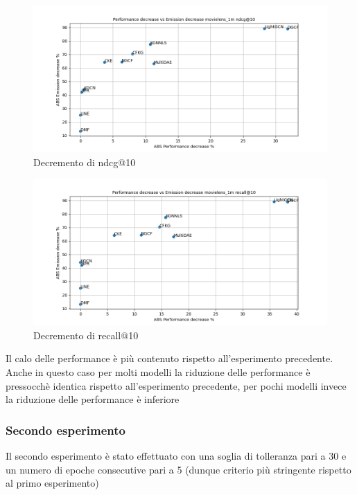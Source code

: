 \begin{figure}[H]
    \centering
    \includegraphics[scale=0.5]{images/decrement_ndcg@10_movielens_1m_40_5.png}
    \caption{Decremento di ndcg@10}
\end{figure}

\begin{figure}[H]
    \centering
    \includegraphics[scale=0.5]{images/decrement_recall@10_movielens_1m_40_5.png}
    \caption{Decremento di recall@10}
\end{figure}
\noindent Il calo delle performance è più contenuto rispetto all'esperimento precedente. Anche in questo caso per molti modelli la riduzione delle performance è pressocchè identica rispetto all'esperimento precedente, per pochi modelli invece la riduzione delle performance è inferiore


\subsubsection{Secondo esperimento}
Il secondo esperimento è stato effettuato con una soglia di tolleranza pari a 30 e un numero di epoche consecutive pari a 5 (dunque criterio più stringente rispetto al primo esperimento)

